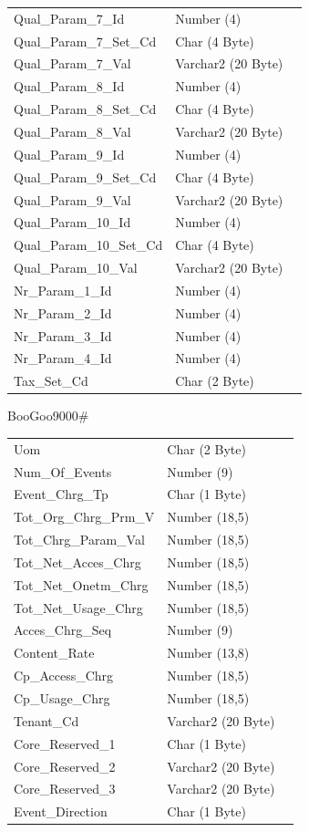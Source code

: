 \documentclass[12pt,twoside]{article}
\begin{document}
\begin{longtable}{l|l|l}
Qual\_Param\_7\_Id & Number (4) & \\
Qual\_Param\_7\_Set\_Cd & Char (4 Byte) & \\
Qual\_Param\_7\_Val & Varchar2 (20 Byte) & \\
Qual\_Param\_8\_Id & Number (4) & \\
Qual\_Param\_8\_Set\_Cd & Char (4 Byte) & \\
Qual\_Param\_8\_Val & Varchar2 (20 Byte) & \\
Qual\_Param\_9\_Id & Number (4) & \\
Qual\_Param\_9\_Set\_Cd & Char (4 Byte) & \\
Qual\_Param\_9\_Val & Varchar2 (20 Byte) & \\
Qual\_Param\_10\_Id & Number (4) & \\
Qual\_Param\_10\_Set\_Cd & Char (4 Byte) & \\
Qual\_Param\_10\_Val & Varchar2 (20 Byte) & \\
Nr\_Param\_1\_Id & Number (4) & \\
Nr\_Param\_2\_Id & Number (4) & \\
Nr\_Param\_3\_Id & Number (4) & \\
Nr\_Param\_4\_Id & Number (4) & \\
Tax\_Set\_Cd & Char (2 Byte) & \\
\end{longtable}
BooGoo9000\#
\begin{center}
\begin{tabular}{lll}
Uom & Char (2 Byte) & \\
Num\_Of\_Events & Number (9) & \\
Event\_Chrg\_Tp & Char (1 Byte) & \\
Tot\_Org\_Chrg\_Prm\_V & Number (18,5) & \\
Tot\_Chrg\_Param\_Val & Number (18,5) & \\
Tot\_Net\_Acces\_Chrg & Number (18,5) & \\
Tot\_Net\_Onetm\_Chrg & Number (18,5) & \\
Tot\_Net\_Usage\_Chrg & Number (18,5) & \\
Acces\_Chrg\_Seq & Number (9) & \\
Content\_Rate & Number (13,8) & \\
Cp\_Access\_Chrg & Number (18,5) & \\
Cp\_Usage\_Chrg & Number (18,5) & \\
Tenant\_Cd & Varchar2 (20 Byte) & \\
Core\_Reserved\_1 & Char (1 Byte) & \\
Core\_Reserved\_2 & Varchar2 (20 Byte) & \\
Core\_Reserved\_3 & Varchar2 (20 Byte) & \\
Event\_Direction & Char (1 Byte) & \\
\hline
\end{tabular}
\end{center}
\normalsize
\end{document}
